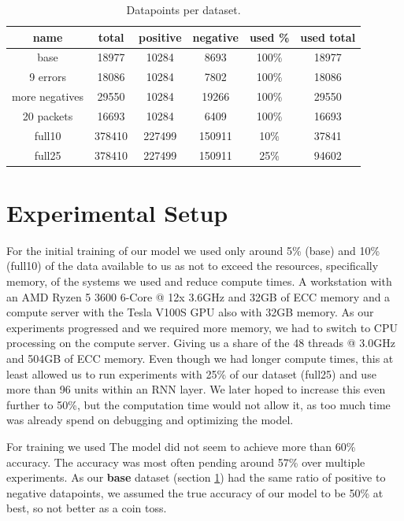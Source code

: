 \documentclass[
	ngerman,
	ruledheaders=section,%
	class=report,%
	thesis={type=bachelor},%
	accentcolor=9c,%
	custommargins=true,%
	marginpar=false,%
	parskip=half-,%
	fontsize=11pt,%
]{tudapub}
\begin{document}
\begin{table}
    \centering
    \begin{tabular}{|c|c|c|c|c|c|}
        \hline
        \textbf{name} & \textbf{total} & \textbf{positive} & \textbf{negative} & \textbf{used \%} & \textbf{used total} \\
        \hline
        base & 18977 & 10284 & 8693 & 100\% & 18977 \\
        \hline
        9 errors & 18086 & 10284 & 7802 & 100\% & 18086 \\
        \hline
        more negatives & 29550 & 10284 & 19266 & 100\% & 29550 \\
        \hline
        20 packets & 16693 & 10284 & 6409 & 100\% & 16693 \\
        \hline
        full10 & 378410 & 227499 & 150911 & 10\% & 37841 \\
        \hline
        full25 & 378410 & 227499 & 150911 & 25\% & 94602 \\
        \hline
    \end{tabular}
    \caption{Datapoints per dataset.}
    \label{tab:datapoints}
\end{table}

\section{Experimental Setup}
\label{sec:exSetup}
\label{sec:exTrainTest}


For the initial training of our model we used only around 5\% (base) and 10\% (full10) of the data available to us as not to exceed the resources, specifically memory, of the systems we used and reduce compute times.
A workstation with an AMD Ryzen 5 3600 6-Core @ 12x 3.6GHz and 32GB of ECC memory and a compute server with the Tesla V100S GPU also with 32GB memory.
As our experiments progressed and we required more memory, we had to switch to CPU processing on the compute server.
Giving us a share of the 48 threads @ 3.0GHz and 504GB of ECC memory.
Even though we had longer compute times, this at least allowed us to run experiments with 25\% of our dataset (full25) and use more than 96 units within an RNN layer.
We later hoped to increase this even further to 50\%, but the computation time would not allow it, as too much time was already spend on debugging and optimizing the model.

For training we used
The model did not seem to achieve more than 60\% accuracy.
The accuracy was most often pending around 57\% over multiple experiments.
As our \textbf{base} dataset (section \ref{tab:datapoints}) had the same ratio of positive to negative datapoints, we assumed the true accuracy of our model to be 50\% at best, so not better as a coin toss.
\end{document}
